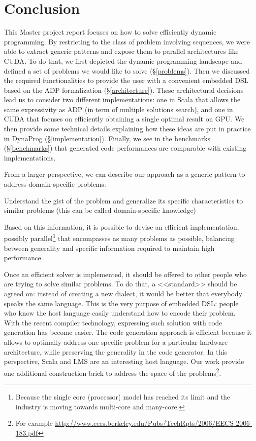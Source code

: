 \newpage
\section{Conclusion}
This Master project report focuses on how to solve efficiently dynamic programming. By restricting to the class of problem involving sequences, we were able to extract generic patterns and expose them to parallel architectures like CUDA. To do that, we first depicted the dynamic programming landscape and defined a set of problems we would like to solve (\S\ref{problems}). Then we discussed the required functionalities to provide the user with a convenient embedded DSL based on the ADP formalization (\S\ref{architecture}). These architectural decisions lead us to consider two different implementations: one in Scala that allows the same expressivity as ADP (in term of multiple solutions search), and one in CUDA that focuses on efficiently obtaining a single optimal result on GPU. We then provide some technical details explaining how these ideas are put in practice in DynaProg (\S\ref{implementation}). Finally, we see in the benchmarks (\S\ref{benchmarks}) that generated code performances are comparable with existing implementations.

From a larger perspective, we can describe our approach as a generic pattern to address domain-specific problems:\ol
\item Understand the gist of the problem and generalize its specific characteristics to similar problems (this can be called domain-specific knowledge)
\item Based on this information, it is possible to devise an efficient implementation, possibly parallel\footnote{Because the single core (processor) model has reached its limit and the industry is moving towards multi-core and many-core.} that encompasses as many problems as possible, balancing between generality and specific information required to maintain high performance.
\item Once an efficient solver is implemented, it should be offered to other people who are trying to solve similar problems. To do that, a <<standard>> should be agreed on: instead of creating a new dialect, it would be better that everybody speaks the same language. This is the very purpose of embedded DSL: people who know the host language easily understand how to encode their problem.
\ole
With the recent compiler technology, expressing such solution with code generation has become easier. The code generation approach is efficient because it allows to optimally address one specific problem for a particular hardware architecture, while preserving the generality in the code generator. In this perspective, Scala and LMS are an interesting host language. Our work provide one additional construction brick to address the space of the problems\footnote{For example \url{http://www.eecs.berkeley.edu/Pubs/TechRpts/2006/EECS-2006-183.pdf}}.


